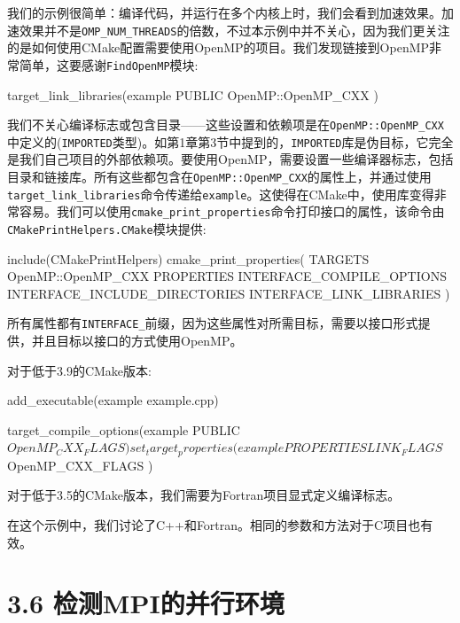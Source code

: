 
我们的示例很简单：编译代码，并运行在多个内核上时，我们会看到加速效果。加速效果并不是\texttt{OMP\_NUM\_THREADS}的倍数，不过本示例中并不关心，因为我们更关注的是如何使用CMake配置需要使用OpenMP的项目。我们发现链接到OpenMP非常简单，这要感谢\texttt{FindOpenMP}模块:

\begin{codebox}[cmake]
target_link_libraries(example
    PUBLIC
        OpenMP::OpenMP_CXX
    )
\end{codebox}

我们不关心编译标志或包含目录——这些设置和依赖项是在\texttt{OpenMP::OpenMP\_CXX}中定义的(\texttt{IMPORTED}类型)。如第1章第3节中提到的，\texttt{IMPORTED}库是伪目标，它完全是我们自己项目的外部依赖项。要使用OpenMP，需要设置一些编译器标志，包括目录和链接库。所有这些都包含在\texttt{OpenMP::OpenMP\_CXX}的属性上，并通过使用\texttt{target\_link\_libraries}命令传递给\texttt{example}。这使得在CMake中，使用库变得非常容易。我们可以使用\texttt{cmake\_print\_properties}命令打印接口的属性，该命令由\texttt{CMakePrintHelpers.CMake}模块提供:

\begin{codebox}[cmake]
include(CMakePrintHelpers)
cmake_print_properties(
    TARGETS
        OpenMP::OpenMP_CXX
    PROPERTIES
        INTERFACE_COMPILE_OPTIONS
        INTERFACE_INCLUDE_DIRECTORIES
        INTERFACE_LINK_LIBRARIES
    )
\end{codebox}

所有属性都有\texttt{INTERFACE\_}前缀，因为这些属性对所需目标，需要以接口形式提供，并且目标以接口的方式使用OpenMP。

对于低于3.9的CMake版本:

\begin{codebox}[cmake]
add_executable(example example.cpp)

target_compile_options(example
  PUBLIC
    ${OpenMP_CXX_FLAGS}
  )
  
set_target_properties(example
  PROPERTIES
    LINK_FLAGS ${OpenMP_CXX_FLAGS}
  )
\end{codebox}

对于低于3.5的CMake版本，我们需要为Fortran项目显式定义编译标志。

在这个示例中，我们讨论了C++和Fortran。相同的参数和方法对于C项目也有效。


\section{3.6 检测MPI的并行环境}

